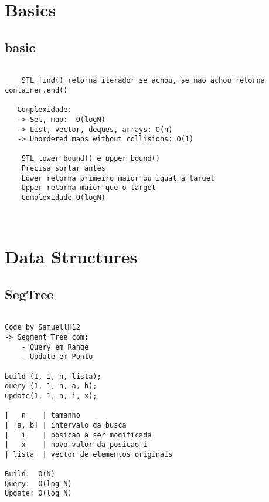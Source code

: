 \section{Basics}
\vspace{-2pt}
\subsection{basic}
\vspace{-4pt}
\begin{lstlisting}[style=description]

    STL find() retorna iterador se achou, se nao achou retorna container.end()
   
   Complexidade:
   -> Set, map:  O(logN)
   -> List, vector, deques, arrays: O(n)
   -> Unordered maps without collisions: O(1)

    STL lower_bound() e upper_bound() 
    Precisa sortar antes
    Lower retorna primeiro maior ou igual a target
    Upper retorna maior que o target
    Complexidade O(logN)

    

\end{lstlisting}
\vspace{-5pt}
\raggedbottom
\hrulefill


\section{Data Structures}
\vspace{-2pt}
\subsection{SegTree}
\vspace{-4pt}
\begin{lstlisting}[style=description]

Code by SamuellH12
-> Segment Tree com:
	- Query em Range
	- Update em Ponto

build (1, 1, n, lista);
query (1, 1, n, a, b);
update(1, 1, n, i, x);

|   n    | tamanho
| [a, b] | intervalo da busca 
|   i    | posicao a ser modificada
|   x    | novo valor da posicao i
| lista  | vector de elementos originais

Build:  O(N)
Query:  O(log N)
Update: O(log N)

\end{lstlisting}
\vspace{-5pt}
\raggedbottom
\hrulefill

